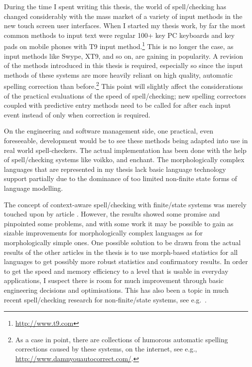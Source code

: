 \documentclass[officiallayout,final]{unihelcompling}
\begin{document}
During the time I spent writing this thesis, the world of spell\-/checking has
changed considerably with the mass market of a variety of input methods in the
new touch screen user interfaces. When I started my thesis work, by far the
most common methods to input text were regular 100+ key PC keyboards and key
pads on mobile phones with T9 input method.\footnote{\url{http://www.t9.com}}
This is no longer the case, as input methods like Swype, XT9, and so on, are
gaining in popularity. A revision of the methods introduced in this thesis is
required, especially so since the input methods of these systems are more
heavily reliant on high quality, automatic spelling correction than
before.\footnote{As a case in point, there are collections of humorous
automatic spelling corrections caused by these systems, on the internet, see
e.g., \url{http://www.damnyouautocorrect.com/}.}  This point will slightly
affect the considerations of the practical evaluations of the speed of
spell\-/checking; new spelling correctors coupled with predictive entry methods
need to be called for after each input event instead of only when correction is
required.

On the engineering and software management side, one practical, even
foreseeable, development would be to see these methods being adapted into use
in real world spell-checkers. The actual implementation has been done with the
help of spell\-/checking systems like voikko, and enchant. The morphologically
complex languages that are represented in my thesis lack basic language
technology support partially due to the dominance of too limited non-finite
state forms of language modelling.

The concept of context-aware spell\-/checking with finite\-/state systems was
merely touched upon by article . However, the
results showed some promise and pinpointed some problems, and with some work it
may be possible to gain as sizable improvements for morphologically complex
languages as for morphologically simple ones. One possible solution to be drawn
from the actual results of the other articles in the thesis is to use
morph-based statistics for all languages to get possibly more robust statistics
and confirmatory results. In order to get the speed and memory efficiency to a
level that is usable in everyday applications, I suspect there is room for much
improvement through basic engineering decisions and optimisations. This has
also been a topic in much  recent spell\-/checking research for
non-finite\-/state systems, see e.g.~\citet{carlson2001scaling}.
\end{document}
